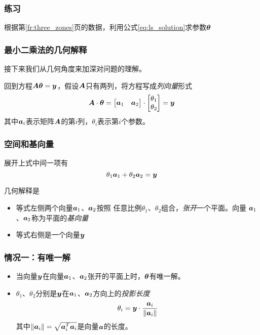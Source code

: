 \documentclass[14pt]{beamer}
\begin{document}
    \begin{frame}
        \frametitle{练习}
        根据第\ref{fr:three_zones}页的数据，利用公式\ref{eq:ls_solution}求参数$\bm{\theta}$
    \end{frame}

    \begin{frame}
        \frametitle{最小二乘法的几何解释}
        接下来我们从几何角度来加深对问题的理解。

        回到方程$\bm{A}\bm{\theta}=\bm{y}$，假设$\bm{A}$只有两列，将方程写成\emph{列向量}形式
        \begin{equation}
            \MA\cdot\Vt=\begin{bmatrix}
                \Va_1 & \Va_2
            \end{bmatrix}\cdot
            \begin{bmatrix}
                \theta_1 \\
                \theta_2 \\
            \end{bmatrix}
            =\Vy
        \end{equation}
        其中$\Va_i$表示矩阵$\bm{A}$的第$i$列，$\theta_i$表示第$i$个参数。
    \end{frame}

    \begin{frame}
        \frametitle{空间和基向量}
        展开上式中间一项有
        \begin{equation}
            \theta_1\Va_1+\theta_2\Va_2=\Vy
        \end{equation}

        几何解释是
        \begin{itemize}
            \item 等式左侧两个向量$\Va_1$、$\Va_2$按照
            任意比例$\theta_1$、$\theta_2$组合，\emph{张开}一个平面。向量
            $\Va_1$、$\Va_2$称为平面的\emph{基向量}
            \item 等式右侧是一个向量$\bm{y}$
        \end{itemize}
    \end{frame}

    \begin{frame}
        \frametitle{情况一：有唯一解}
        \begin{itemize}
            \item 当向量$\bm{y}$在向量$\Va_1$、$\Va_2$张开的平面上时，$\bm{\theta}$有唯一解。
            \item $\theta_1$、$\theta_2$分别是$\bm{y}$在$\Va_1$、$\Va_2$方向上的\emph{投影长度}
            \begin{equation}
                \theta_i = \Vy\cdot\frac{\Va_i}{\|\Va_i\|}
            \end{equation}
            其中$\|\Va_i\|=\sqrt{\Va_i^T\Va_i}$是向量$\Va$的长度。
        \end{itemize}
    \end{frame}
\end{document}
